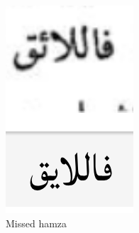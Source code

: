 \begin{figure}[!ht]
	\centering
	\begin{subfigure}[b]{0.3\linewidth}
	\centering
	\includegraphics[width=\textwidth]{images/image28.png}
	\caption{Missed hamza}
	\label{fig3:fig18}
	\end{subfigure}
	\begin{subfigure}[b]{0.3\linewidth}
	\centering

\end{subfigure}
\end{figure}
